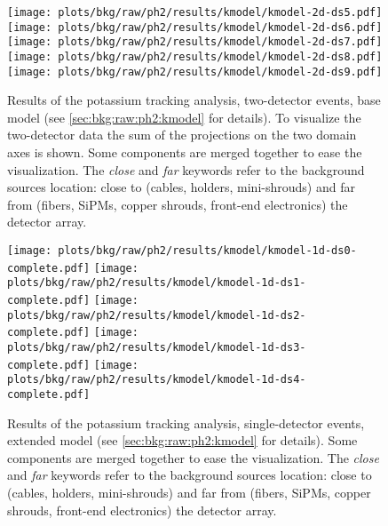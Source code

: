 \begin{figure}
  \centering
  \texttt{[image: plots/bkg/raw/ph2/results/kmodel/kmodel-2d-ds5.pdf]}
  \texttt{[image: plots/bkg/raw/ph2/results/kmodel/kmodel-2d-ds6.pdf]}\vspace{10pt}
  \texttt{[image: plots/bkg/raw/ph2/results/kmodel/kmodel-2d-ds7.pdf]}
  \texttt{[image: plots/bkg/raw/ph2/results/kmodel/kmodel-2d-ds8.pdf]}\vspace{10pt}
  \texttt{[image: plots/bkg/raw/ph2/results/kmodel/kmodel-2d-ds9.pdf]}
  \begin{minipage}[b][5.65cm][c]{0.45\textwidth}
    \hspace{15pt}%
    \parbox{0.91\textwidth}{%
      Results of the potassium tracking analysis, two-detector events, base model (see
      \cref{sec:bkg:raw:ph2:kmodel} for details). To visualize the two-detector data the
      sum of the projections on the two domain axes is shown. Some components are merged
      together to ease the visualization. The \emph{close} and \emph{far} keywords refer
      to the background sources location: close to (cables, holders, mini-shrouds) and far
      from (fibers, SiPMs, copper shrouds, front-end electronics) the detector array.
    }
  \end{minipage}
\end{figure}

\begin{figure}
  \centering
  \texttt{[image: plots/bkg/raw/ph2/results/kmodel/kmodel-1d-ds0-complete.pdf]}
  \texttt{[image: plots/bkg/raw/ph2/results/kmodel/kmodel-1d-ds1-complete.pdf]}\vspace{10pt}
  \texttt{[image: plots/bkg/raw/ph2/results/kmodel/kmodel-1d-ds2-complete.pdf]}
  \texttt{[image: plots/bkg/raw/ph2/results/kmodel/kmodel-1d-ds3-complete.pdf]}\vspace{10pt}
  \texttt{[image: plots/bkg/raw/ph2/results/kmodel/kmodel-1d-ds4-complete.pdf]}
  \begin{minipage}[b][5.65cm][c]{0.45\textwidth}
    \hspace{15pt}%
    \parbox{0.91\textwidth}{%
      Results of the potassium tracking analysis, single-detector events, extended model (see
      \cref{sec:bkg:raw:ph2:kmodel} for details). Some components are merged together to
      ease the visualization. The \emph{close} and \emph{far} keywords refer to the
      background sources location: close to (cables, holders, mini-shrouds) and far from
      (fibers, SiPMs, copper shrouds, front-end electronics) the detector array.
    }
  \end{minipage}
\end{figure}

